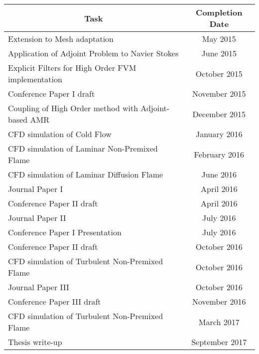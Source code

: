 \begin{tabular}{|l|c|} \hline
\multicolumn{1}{|c|}{\bf{Task}} & \multicolumn{1}{|c|}{\bf{Completion Date}} \\

\hline Extension to Mesh adaptation & May 2015\\

\hline Application of Adjoint Problem to Navier Stokes  & June 2015\\

\hline Explicit Filters for High Order FVM implementation  & October 2015\\

\hline Conference Paper I draft & November 2015\\

\hline Coupling of High Order method with Adjoint-based AMR & December 2015\\

\hline CFD simulation of Cold Flow & January 2016\\

\hline CFD simulation of Laminar Non-Premixed Flame & February 2016\\

\hline CFD simulation of Laminar Diffusion Flame & June 2016\\

\hline Journal Paper I & April 2016\\

\hline Conference Paper II draft & April 2016\\

\hline Journal Paper II & July 2016\\

\hline Conference Paper I Presentation  & July 2016\\

\hline Conference Paper II draft  & October 2016\\

\hline CFD simulation of Turbulent Non-Premixed Flame & October 2016\\

\hline Journal Paper III & October 2016\\

\hline Conference Paper III draft  & November 2016\\

\hline CFD simulation of Turbulent Non-Premixed Flame & March 2017\\

\hline Thesis write-up & September 2017 \\ 

\hline

\end{tabular}
